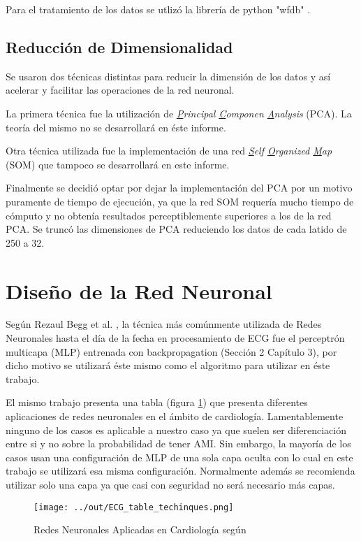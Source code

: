 \documentclass[conference]{IEEEtran}
\theoremstyle{definition}
\begin{document}
Para el tratamiento de los datos se utlizó la librería de python "wfdb" \cite{WFDB}.

\subsection{Reducción de Dimensionalidad}

Se usaron dos técnicas distintas para reducir la dimensión de los datos y así acelerar y facilitar las operaciones de la red neuronal.

La primera técnica fue la utilización de \textit{\underline{P}rincipal \underline{C}omponen \underline{A}nalysis} (PCA). La teoría del mismo no se desarrollará en éste informe.

Otra técnica utilizada fue la implementación de una red \textit{\underline{S}elf \underline{O}rganized \underline{M}ap} (SOM) que tampoco se desarrollará en este informe.

Finalmente se decidió optar por dejar la implementación del PCA por un motivo puramente de tiempo de ejecución, ya que la red SOM requería mucho tiempo de cómputo y no obtenía resultados perceptiblemente superiores a los de la red PCA. Se truncó las dimensiones de PCA reduciendo los datos de cada latido de 250 a 32.

\section{Diseño de la Red Neuronal}

Según Rezaul Begg et al. \cite{NN_HEALTHCARE}, la técnica más comúnmente utilizada de Redes Neuronales hasta el día de la fecha en procesamiento de ECG fue el perceptrón multicapa (MLP) entrenada con backpropagation (Sección 2 Capítulo 3), por dicho motivo se utilizará éste mismo como el algoritmo para utilizar en éste trabajo.

El mismo trabajo presenta una tabla (figura \ref{tab_tabla_comparacion_tecnicas}) que presenta diferentes aplicaciones de redes neuronales en el ámbito de cardiología. Lamentablemente ninguno de los casos es aplicable a nuestro caso ya que suelen ser diferenciación entre si y no sobre la probabilidad de tener AMI. Sin embargo, la mayoría de los casos usan una configuración de MLP de una sola capa oculta con lo cual en este trabajo se utilizará esa misma configuración.
Normalmente además se recomienda utilizar solo una capa ya que casi con seguridad no será necesario más capas.

\begin{figure}[H]
	\centering
	\texttt{[image: ../out/ECG\_table\_techinques.png]}
	\caption{Redes Neuronales Aplicadas en Cardiología según \cite{NN_HEALTHCARE}}
	\label{tab_tabla_comparacion_tecnicas}
\end{figure}
\end{document}
